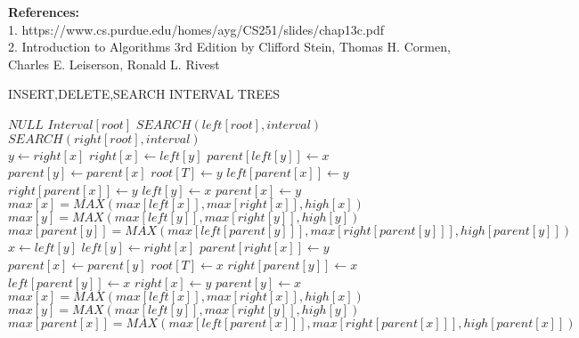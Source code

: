 \documentclass[11pt]{article}
\begin{document}
\textbf{References:}\\
1. https://www.cs.purdue.edu/homes/ayg/CS251/slides/chap13c.pdf
\\
2. Introduction to Algorithms 3rd Edition by Clifford Stein, Thomas H. Cormen, Charles E. Leiserson, Ronald L. Rivest
\begin{algorithm}[h]
\caption{INSERT,DELETE,SEARCH INTERVAL TREES}\label{euclid}
\begin{algorithmic}[1]
 
\Return $NULL$
\EndIf
{} 
\Return $Interval[root]$
\EndIf
{}
\Return $SEARCH(left[root],interval)$
\EndIf
\Return $SEARCH(right[root],interval)$ 
\EndProcedure
\\
\State $y \gets right[x]$
\State $right[x] \gets left[y]$
\State $parent[left[y]] \gets x$ 
\EndIf
\State $parent[y] \gets parent[x]$
\State $root[T] \gets y$
\State $left[parent[x]] \gets y$
\Else 
\State $right[parent[x]] \gets y$
\EndIf
\State $ left[y] \gets x$
\State $ parent[x] \gets y$
\State $max[x]=MAX(max[left[x]],max[right[x]],high[x])$ 
\State $max[y]=MAX(max[left[y]],max[right[y]],high[y])$
\State $max[parent[y]]=MAX(max[left[parent[y]]],max[right[parent[y]]],high[parent[y]])$
\EndProcedure
\\
 
\State $x \gets left[y]$
\State $left[y] \gets right[x]$
\State $parent[right[x]] \gets y$
\EndIf
\State $parent[x] \gets parent[y]$
\State $root[T] \gets x$
\State $right[parent[y]] \gets x$
\Else 
\State $left[parent[y]] \gets x$
\EndIf
\State $ right[x] \gets y$
\State $ parent[y] \gets x$
\State $max[x]=MAX(max[left[x]],max[right[x]],high[x])$
\State $max[y]=MAX(max[left[y]],max[right[y]],high[y])$
\State $max[parent[x]]=MAX(max[left[parent[x]]],max[right[parent[x]]],high[parent[x]])$
\EndProcedure
\\
\end{algorithmic}
\end{algorithm}
\end{document}
